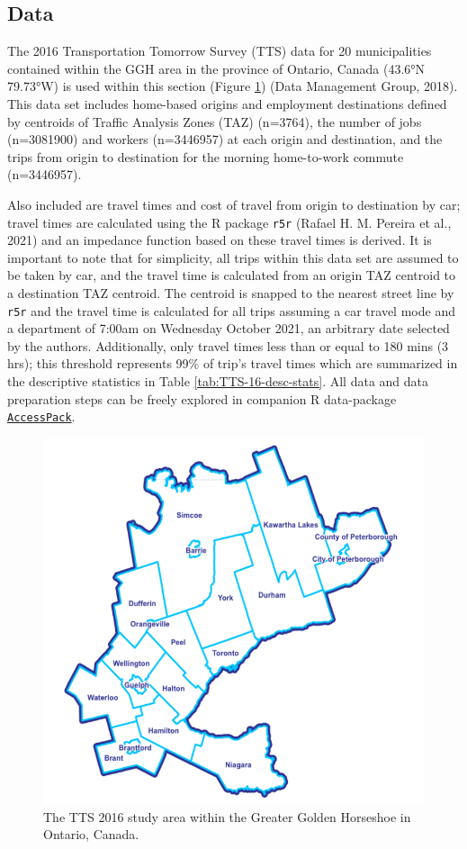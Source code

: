 \documentclass[]{elsarticle} %
\begin{document}
\hypertarget{data}{%
\subsection{Data}\label{data}}

The 2016 Transportation Tomorrow Survey (TTS) data for 20 municipalities
contained within the GGH area in the province of Ontario, Canada (43.6°N
79.73°W) is used within this section (Figure
\ref{fig:TTS-16-survey-area}) (Data Management Group, 2018). This data
set includes home-based origins and employment destinations defined by
centroids of Traffic Analysis Zones (TAZ) (n=3764), the number of jobs
(n=3081900) and workers (n=3446957) at each origin and destination, and
the trips from origin to destination for the morning home-to-work
commute (n=3446957).

Also included are travel times and cost of travel from origin to
destination by car; travel times are calculated using the R package
\texttt{r5r} (Rafael H. M. Pereira et al., 2021) and an impedance
function based on these travel times is derived. It is important to note
that for simplicity, all trips within this data set are assumed to be
taken by car, and the travel time is calculated from an origin TAZ
centroid to a destination TAZ centroid. The centroid is snapped to the
nearest street line by \texttt{r5r} and the travel time is calculated
for all trips assuming a car travel mode and a department of 7:00am on
Wednesday October 2021, an arbitrary date selected by the authors.
Additionally, only travel times less than or equal to 180 mins (3 hrs);
this threshold represents 99\% of trip's travel times which are
summarized in the descriptive statistics in Table
\ref{tab:TTS-16-desc-stats}. All data and data preparation steps can be
freely explored in companion R data-package
\href{https://github.com/soukhova/AccessPack}{\texttt{AccessPack}}.

\begin{figure}

{\centering \includegraphics[width=0.7\linewidth]{images/Greater-Golden-Horseshoe-Map} 

}

\caption{\label{fig:TTS-16-survey-area}The TTS 2016 study area within the Greater Golden Horseshoe in Ontario, Canada.}\label{fig:TTS-16-survey-area}
\end{figure}
\end{document}
